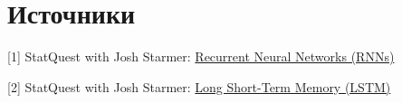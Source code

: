 \section{Источники}

[1] StatQuest with Josh Starmer: \href{https://youtu.be/AsNTP8Kwu80?si=N-Snml3hPPGoP0i3}{Recurrent Neural Networks (RNNs)}

[2] StatQuest with Josh Starmer: \href{https://www.youtube.com/watch?v=YCzL96nL7j0&list=PLblh5JKOoLUIxGDQs4LFFD--41Vzf-ME1&index=16&ab_channel=StatQuestwithJoshStarmer}{Long Short-Term Memory (LSTM)}


